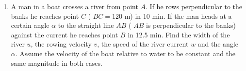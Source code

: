 \documentclass{article}
\begin{document}
\begin{enumerate}
    \item A man in a boat crosses a river from point \( A \). If he rows perpendicular to the banks he reaches point \( C \) ( \( BC = 120 \) m) in 10 min. If the man heads at a certain angle \( \alpha \) to the straight line \( AB \) ( \( AB \) is perpendicular to the banks) against the current he reaches point \( B \) in 12.5 min. Find the width of the river \( u \), the rowing velocity \( v \), the speed of the river current \( w \) and the angle \( \alpha \). Assume the velocity of the boat relative to water to be constant and the same magnitude in both cases.

    \begin{center}
    \end{center}
\end{enumerate}
\end{document}
